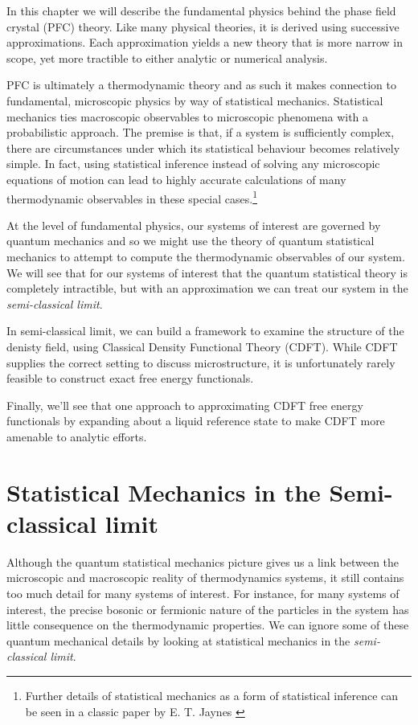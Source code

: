 In this chapter we will describe the fundamental physics behind the phase field
crystal (PFC) theory.  Like many physical theories, it is derived using successive
approximations.  Each approximation yields a new theory that is more narrow in
scope, yet more tractible to either analytic or numerical analysis.

PFC is ultimately a thermodynamic theory and as such it makes connection to
fundamental, microscopic physics by way of statistical mechanics.  Statistical
mechanics ties macroscopic observables to microscopic phenomena with a
probabilistic approach.  The premise is that, if a system is sufficiently
complex, there are circumstances under which its statistical behaviour becomes
relatively simple.  In fact, using statistical inference instead of solving any
microscopic equations of motion can lead to highly accurate calculations of
many thermodynamic observables in these special cases.\footnote{Further details
of statistical mechanics as a form of statistical inference can be seen in a
classic paper by E. T. Jaynes \cite{JAYNES57}}

At the level of fundamental physics, our systems of interest are governed by
quantum mechanics and so we might use the theory of quantum statistical
mechanics to attempt to compute the thermodynamic observables of our system.
We will see that for our systems of interest that the quantum statistical
theory is completely intractible, but with an approximation we can treat our
system in the \textit{semi-classical limit}.

In semi-classical limit, we can build a framework to examine the structure of
the denisty field, using Classical Density Functional Theory (CDFT). While CDFT
supplies the correct setting to discuss microstructure, it is unfortunately
rarely feasible to construct exact free energy functionals.

Finally, we'll see that one approach to approximating CDFT free energy
functionals by expanding about a liquid reference state to make CDFT more
amenable to analytic efforts.

\section{Statistical Mechanics in the Semi-classical limit} %

Although the quantum statistical mechanics picture gives us a link between the
microscopic and macroscopic reality of thermodynamics systems, it still
contains too much detail for many systems of interest.  For instance, for many
systems of interest, the precise bosonic or fermionic nature of the particles
in the system has little consequence on the thermodynamic properties.  We can
ignore some of these quantum mechanical details by looking at statistical
mechanics in the \textit{semi-classical limit}.

